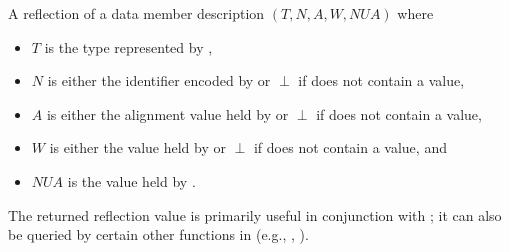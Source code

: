 \begin{itemdescr}
\pnum
\returns
A reflection of a data member description
$(T, N, A, W, \mathit{NUA})$ where
\begin{itemize}
\item
  $T$ is the type represented by ,
\item
  $N$ is either the identifier encoded by 
  or $\perp$ if  does not contain a value,
\item
  $A$ is either the alignment value held by 
  or $\perp$ if  does not contain a value,
\item
  $W$ is either the value held by 
  or $\perp$ if  does not contain a value, and
\item
  $\mathit{NUA}$ is the value held by .
\end{itemize}
\begin{note}
The returned reflection value is primarily useful
in conjunction with ;
it can also be queried by certain other functions in 
(e.g., , ).
\end{note}


\end{itemdescr}
